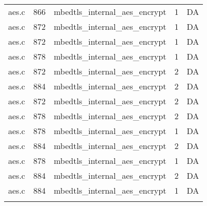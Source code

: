 \begin{table}[h]
{\begin{tabular}{clrrr}
aes.c&866&mbedtls\_internal\_aes\_encrypt&1 &DA\\
aes.c&872&mbedtls\_internal\_aes\_encrypt&1 &DA\\
aes.c&872&mbedtls\_internal\_aes\_encrypt&1 &DA\\
aes.c&878&mbedtls\_internal\_aes\_encrypt&1 &DA\\
aes.c&872&mbedtls\_internal\_aes\_encrypt&2 &DA\\
aes.c&884&mbedtls\_internal\_aes\_encrypt&2 &DA\\
aes.c&872&mbedtls\_internal\_aes\_encrypt&2 &DA\\
aes.c&878&mbedtls\_internal\_aes\_encrypt&2 &DA\\
aes.c&878&mbedtls\_internal\_aes\_encrypt&1 &DA\\
aes.c&884&mbedtls\_internal\_aes\_encrypt&2 &DA\\
aes.c&878&mbedtls\_internal\_aes\_encrypt&1 &DA\\
aes.c&884&mbedtls\_internal\_aes\_encrypt&2 &DA\\
aes.c&884&mbedtls\_internal\_aes\_encrypt&1 &DA\\
&&&&\\
\hline
\end{tabular}
}
\end{table}